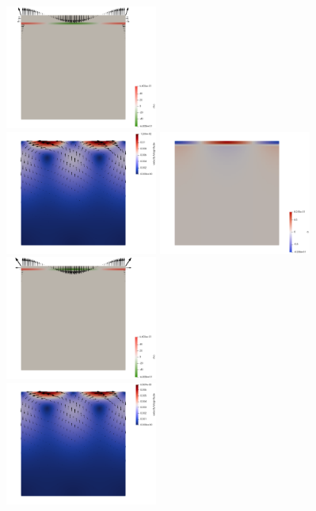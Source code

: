 \begin{center}
\includegraphics[width=5cm]{python_codes/fieldstone_27/results/59_64/tractions}\\
\includegraphics[width=5cm]{python_codes/fieldstone_27/results/62_64/vel}
\includegraphics[width=5cm]{python_codes/fieldstone_27/results/62_64/p}
\includegraphics[width=5cm]{python_codes/fieldstone_27/results/62_64/tractions}\\
\includegraphics[width=5cm]{python_codes/fieldstone_27/results/63_64/vel}

\end{center}
